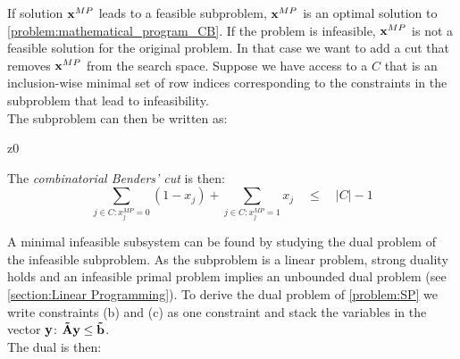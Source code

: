 If solution $\bold x^{MP}$ leads to a feasible subproblem, $\bold x^{MP}$ is an optimal solution to \cref{problem:mathematical_program_CB}. If the problem is infeasible, $\bold x^{MP}$ is not a feasible solution for the original problem. In that case we want to add a cut that removes $\bold x^{MP}$ from the search space. Suppose we have access to a  $C$ that is an inclusion-wise minimal set of row indices corresponding to the constraints in the subproblem that lead to infeasibility.\\
The subproblem can then be written as:
\begin{mini!}
    {\scriptstyle \bold z}{0}{}{}
\end{mini!}
The \textit{combinatorial Benders' cut} is then: 
\begin{equation*}
    \sum_{j \in C: x_j^{MP}=0} (1 - x_{j}) + \sum_{j \in C: x_j^{MP}=1} x_j \quad \leq \quad |C| -1
\end{equation*}

A minimal infeasible subsystem can be found by studying the dual problem of the infeasible subproblem. As the subproblem is a linear problem, strong duality holds and an infeasible primal problem implies an unbounded dual problem (see \cref{section:Linear Programming}).
To derive the dual problem of \cref{problem:SP} we write constraints (b) and (c) as one constraint and stack the variables in the vector $\bold y$: $\bold{\tilde A} \bold y \leq \bold{\tilde b}$. \\
The dual is then:

